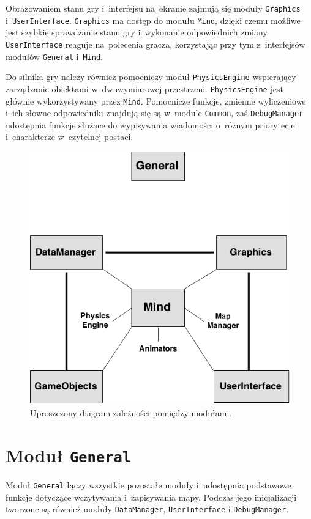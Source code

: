\documentclass[licencjacka]{pracamgr}
\begin{document}
    Obrazowaniem stanu gry i~interfejsu na~ekranie zajmują się moduły \texttt{Graphics} i~\texttt{UserInterface}.
    \texttt{Graphics} ma dostęp do modułu \texttt{Mind}, dzięki czemu możliwe jest szybkie sprawdzanie stanu
    gry i~wykonanie odpowiednich zmiany. \texttt{UserInterface} reaguje na~polecenia gracza, korzystając przy tym z~interfejsów modułów
    \texttt{General} i~\texttt{Mind}.

    Do silnika gry należy również pomocniczy moduł \texttt{PhysicsEngine} wspierający zarządzanie obiektami w~dwuwymiarowej przestrzeni.
    \texttt{PhysicsEngine} jest głównie wykorzystywany przez \texttt{Mind}. Pomocnicze funkcje, zmienne wyliczeniowe i~ich słowne 
    odpowiedniki znajdują się są w~module \texttt{Common}, zaś \texttt{DebugManager} udostępnia funkcje służące do wypisywania wiadomości
    o~różnym priorytecie i~charakterze w~czytelnej postaci.

    \begin{figure}[htbp]
      \centering
      \includegraphics[scale=0.5]{diagram-klas.png}
      \caption{Uproszczony diagram zależności pomiędzy modułami.}
    \end{figure}

  \section{Moduł \texttt{General}}
    Moduł \texttt{General} łączy wszystkie pozostałe moduły i~udostępnia podstawowe funkcje dotyczące wczytywania i~zapisywania
    mapy. Podczas jego inicjalizacji tworzone są również moduły \texttt{DataManager}, \texttt{UserInterface} i
    \texttt{DebugManager}.
\end{document}
